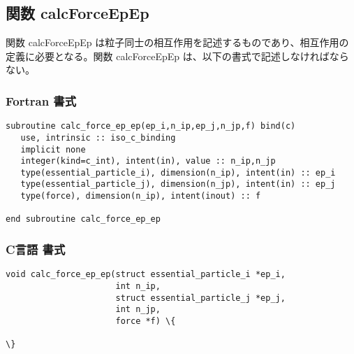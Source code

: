\subsection{関数 calcForceEpEp}
\label{subsec:calcForceEpEp}
関数 calcForceEpEp は粒子同士の相互作用を記述するものであり、相互作用の定義に必要となる。関数 calcForceEpEp は、以下の書式で記述しなければならない。

\subsubsection*{Fortran 書式}
\begin{screen}
\begin{Verbatim}[commandchars=\\\{\}]
subroutine calc_force_ep_ep(ep_i,n_ip,ep_j,n_jp,f) bind(c)
   use, intrinsic :: iso_c_binding
   implicit none
   integer(kind=c_int), intent(in), value :: n_ip,n_jp
   type(essential_particle_i), dimension(n_ip), intent(in) :: ep_i
   type(essential_particle_j), dimension(n_jp), intent(in) :: ep_j
   type(force), dimension(n_ip), intent(inout) :: f
   
end subroutine calc_force_ep_ep
\end{Verbatim}
\end{screen}

\subsubsection*{C言語 書式}
\begin{screen}
\begin{Verbatim}[commandchars=\\\{\}]
void calc_force_ep_ep(struct essential_particle_i *ep_i,
                      int n_ip,
                      struct essential_particle_j *ep_j,
                      int n_jp,
                      force *f) \{
                        
\}
\end{Verbatim}
\end{screen}

